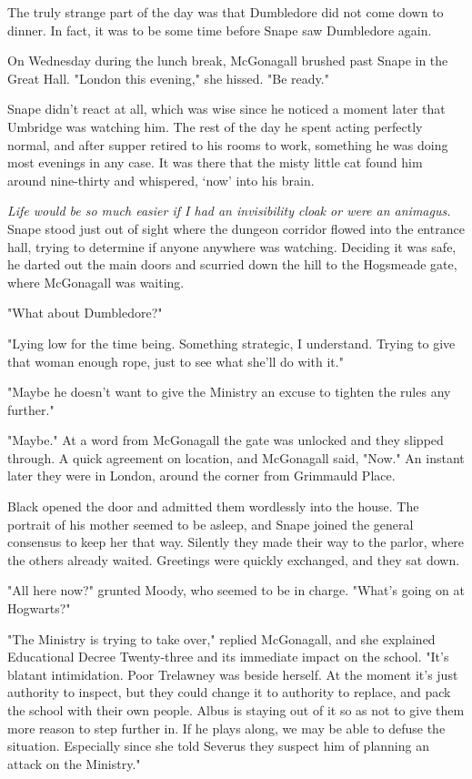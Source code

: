 \documentclass[a4paper,11pt]{article}
\begin{document}
The truly strange part of the day was that Dumbledore did not come down to dinner. In fact, it was to be some time before Snape saw Dumbledore again.

On Wednesday during the lunch break, McGonagall brushed past Snape in the Great Hall. "London this evening," she hissed. "Be ready."

Snape didn't react at all, which was wise since he noticed a moment later that Umbridge was watching him. The rest of the day he spent acting perfectly normal, and after supper retired to his rooms to work, something he was doing most evenings in any case. It was there that the misty little cat found him around nine-thirty and whispered, `now' into his brain.

\emph{Life would be so much easier if I had an invisibility cloak or were an animagus.} Snape stood just out of sight where the dungeon corridor flowed into the entrance hall, trying to determine if anyone anywhere was watching. Deciding it was safe, he darted out the main doors and scurried down the hill to the Hogsmeade gate, where McGonagall was waiting.

"What about Dumbledore?"

"Lying low for the time being. Something strategic, I understand. Trying to give that woman enough rope, just to see what she'll do with it."

"Maybe he doesn't want to give the Ministry an excuse to tighten the rules any further."

"Maybe." At a word from McGonagall the gate was unlocked and they slipped through. A quick agreement on location, and McGonagall said, "Now." An instant later they were in London, around the corner from Grimmauld Place.

Black opened the door and admitted them wordlessly into the house. The portrait of his mother seemed to be asleep, and Snape joined the general consensus to keep her that way. Silently they made their way to the parlor, where the others already waited. Greetings were quickly exchanged, and they sat down.

"All here now?" grunted Moody, who seemed to be in charge. "What's going on at Hogwarts?"

"The Ministry is trying to take over," replied McGonagall, and she explained Educational Decree Twenty-three and its immediate impact on the school. "It's blatant intimidation. Poor Trelawney was beside herself. At the moment it's just authority to inspect, but they could change it to authority to replace, and pack the school with their own people. Albus is staying out of it so as not to give them more reason to step further in. If he plays along, we may be able to defuse the situation. Especially since she told Severus they suspect him of planning an attack on the Ministry."
\end{document}
